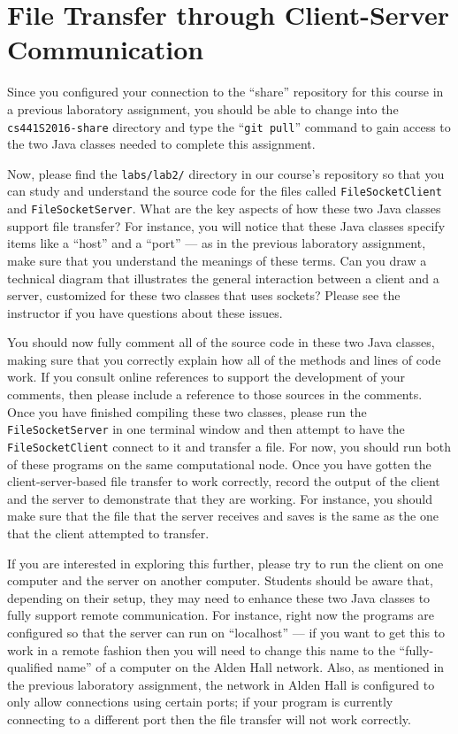 \section*{File Transfer through Client-Server Communication}

Since you configured your connection to the ``share'' repository for this course in a previous laboratory assignment,
you should be able to change into the {\tt cs441S2016-share} directory and type the ``{\tt git pull}'' command to gain
access to the two Java classes needed to complete this assignment.

Now, please find the {\tt labs/lab2/} directory in our course's repository so that you can study and understand the
source code for the files called {\tt FileSocketClient} and {\tt FileSocketServer}. What are the key aspects of how
these two Java classes support file transfer? For instance, you will notice that these Java classes specify items like a
``host'' and a ``port'' --- as in the previous laboratory assignment, make sure that you understand the meanings of
these terms. Can you draw a technical diagram that illustrates the general interaction between a client and a server,
customized for these two classes that uses sockets? Please see the instructor if you have questions about these issues.

You should now fully comment all of the source code in these two Java classes, making sure that you correctly explain
how all of the methods and lines of code work. If you consult online references to support the development of your
comments, then please include a reference to those sources in the comments. Once you have finished compiling these two
classes, please run the {\tt FileSocketServer} in one terminal window and then attempt to have the {\tt
FileSocketClient} connect to it and transfer a file. For now, you should run both of these programs on the same
computational node. Once you have gotten the client-server-based file transfer to work correctly, record the output of the
client and the server to demonstrate that they are working. For instance, you should make sure that the file that the
server receives and saves is the same as the one that the client attempted to transfer.

If you are interested in exploring this further, please try to run the client on one computer and the server on another
computer. Students should be aware that, depending on their setup, they may need to enhance these two Java classes to
fully support remote communication. For instance, right now the programs are configured so that the server can run on
``localhost'' --- if you want to get this to work in a remote fashion then you will need to change this name to the
``fully-qualified name'' of a computer on the Alden Hall network. Also, as mentioned in the previous laboratory
assignment, the network in Alden Hall is configured to only allow connections using certain ports; if your program is
currently connecting to a different port then the file transfer will not work correctly.

